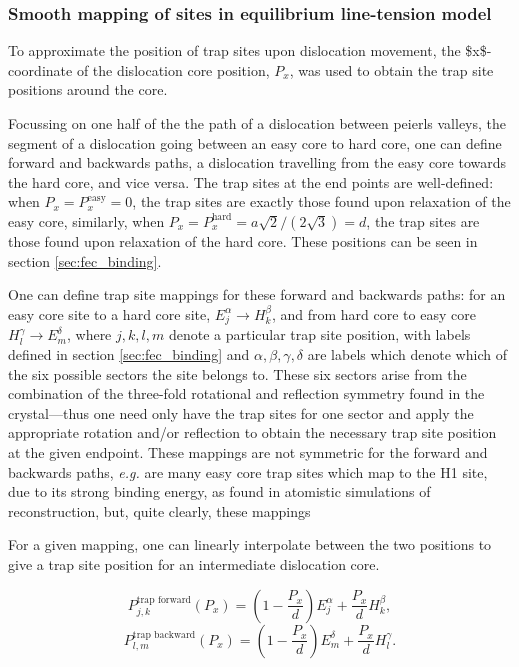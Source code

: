 \documentclass[a4paper,11pt]{article}
\numberwithin{equation}{chapter}
\numberwithin{listing}{chapter}
\begin{document}
\subsubsection{Smooth mapping of sites in equilibrium line-tension model}
\label{sec:org614f22f}
\label{sec:smoothsitemapping}

To approximate the position of trap sites upon dislocation movement, the
\$x\$-coordinate of the dislocation core position, \(P_x\), was used to obtain the trap
site positions around the core.

Focussing on one half of the the path of a dislocation between peierls
valleys, the segment of a dislocation going between an easy core to hard
core, one can define forward and backwards paths, a dislocation travelling
from the easy core towards the hard core, and vice versa. The trap sites at
the end points are well-defined: when \(P_x = P_x^{\text{easy}} = 0\), the trap
sites are exactly those found upon relaxation of the easy core, similarly,
when \(P_x = P_x^{\text{hard}} = a\sqrt{2} / (2\sqrt{3}) = d\), the trap sites are
those found upon relaxation of the hard core. These positions can be seen in
section \ref{sec:fec_binding}.

One can define trap site mappings for these forward and backwards paths: for an easy
core site to a hard core site, \(E_j^{\alpha} \rightarrow H_k^{\beta}\), and
from hard core to easy core \(H_l^{\gamma} \rightarrow E_m^{\delta}\), where
\(j,k,l,m\) denote a particular trap site position, with labels defined in section \ref{sec:fec_binding} and
\(\alpha,\beta,\gamma,\delta\) are labels which denote which of the six possible sectors the
site belongs to. These six sectors arise from the combination of the
three-fold rotational and reflection symmetry found in the crystal---thus one
need only have the trap sites for one sector and apply the appropriate rotation and/or
reflection to obtain the necessary trap site position at the given endpoint. These mappings are not
symmetric for the forward and backwards paths, \emph{e.g.} are many easy core trap
sites which map to the H1 site, due to its strong binding energy, as found in
atomistic simulations of reconstruction, but, quite clearly, these mappings


For a given mapping, one can linearly interpolate between the two positions to give a trap site position for an
intermediate dislocation core.

\[ P^{\text{trap forward}}_{j,k}(P_x) =  \left( 1-\frac{P_x}{d} \right) E_j^{\alpha} +   \frac{P_x}{d}H_k^{\beta},\]
\[ P^{\text{trap backward}}_{l,m}(P_x) =  \left( 1-\frac{P_x}{d} \right) E_m ^{\delta} + \frac{P_x}{d}H_l^{\gamma}.\]
\end{document}
